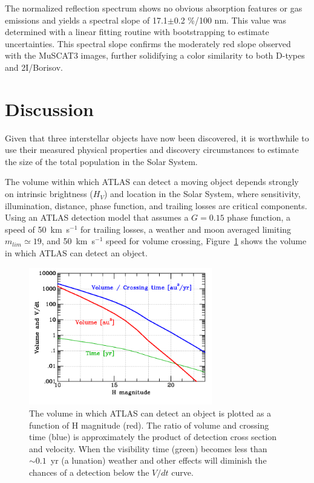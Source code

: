 \documentclass[linenumbers,twocolumn,longbib]{aastex7}
\begin{document}
The normalized reflection spectrum shows no obvious absorption features or gas emissions and yields a spectral slope of 17.1$\pm$0.2  \%/100 nm. This value was determined with a linear fitting routine with bootstrapping to estimate uncertainties. This spectral slope confirms the moderately red slope observed with the MuSCAT3 images, further solidifying a color similarity to both D-types and 2I/Borisov.

\section{Discussion}\label{sec:discussion}

Given that three interstellar objects have now been discovered, it is worthwhile to use their measured physical properties and discovery circumstances to estimate the size of the total population in the Solar System.

The volume within which ATLAS can detect a moving object depends strongly on intrinsic brightness ($H_V$) and location in the Solar System, where sensitivity, illumination, distance, phase function, and trailing losses are critical components. Using an ATLAS detection model that assumes a $G=0.15$ phase function, a speed of 50~km~s$^{-1}$ for trailing losses, a weather and moon averaged limiting $m_{lim}\simeq19$, and 50~km~s$^{-1}$ speed for volume crossing, Figure~\ref{fig:3I_rate} shows the volume in which ATLAS can detect an object.

\begin{figure}
\includegraphics[width=80mm]{static/3I_xc.png}
\caption{The volume in which ATLAS can detect an object is plotted as a function of H magnitude (red).  The ratio of volume and crossing time (blue) is approximately the product of detection cross section and velocity.  When the visibility time (green) becomes less than $\sim0.1$~yr (a lunation) weather and other effects will diminish the chances of a detection below the $V/dt$ curve.}
\label{fig:3I_rate}
\end{figure}
\end{document}
